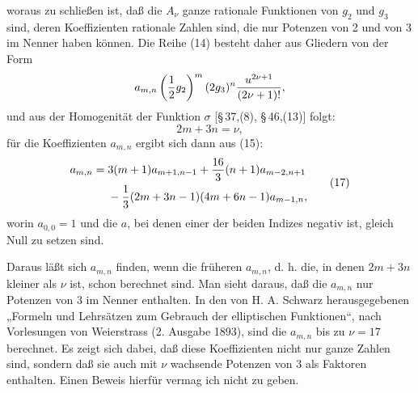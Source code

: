 \documentclass[11pt]{article}
\begin{document}
woraus zu schließen ist, daß die $A_\nu$ ganze rationale Funktionen von $g_2$ und $g_3$ sind, deren Koeffizienten rationale Zahlen sind, die nur Potenzen von 2 und von 3 im Nenner haben können. Die Reihe (14) besteht daher aus Gliedern von der Form
\[
a_{m,n}\left({1\over2}g_2\right)^m(2g_3)^n{u^{2\nu+1}\over(2\nu+1)!},
\]
und aus der Homogenität der Funktion $\sigma$ [\S\,37,(8), \S\,46,(13)] folgt:
\begin{equation}
2m+3n=\nu,
\tag{16}
\end{equation}
für die Koeffizienten $a_{m,n}$ ergibt sich dann aus (15):
\begin{equation}
\begin{aligned}
a_{m,n}={}&3(m+1)a_{m+1,n-1}+{16\over3}(n+1)a_{m-2,n+1}\\
&-{1\over3}(2m+3n-1)(4m+6n-1)a_{m-1,n},
\end{aligned}
\tag{17}
\end{equation}
worin $a_{0,0}=1$ und die $a$, bei denen einer der beiden Indizes negativ ist, gleich Null zu setzen sind.

Daraus läßt sich $a_{m,n}$ finden, wenn die früheren $a_{m,n}$, d. h. die, in denen $2m+3n$ kleiner als $\nu$ ist, schon berechnet sind. Man sieht daraus, daß die $a_{m,n}$ nur Potenzen von 3 im Nenner enthalten. In den von H. A. Schwarz herausgegebenen „Formeln und Lehrsätzen zum Gebrauch der elliptischen Funktionen“, nach Vorlesungen von Weierstrass (2. Ausgabe 1893), sind die $a_{m,n}$ bis zu $\nu=17$ berechnet. Es zeigt sich dabei, daß diese Koeffizienten nicht nur ganze Zahlen sind, sondern daß sie auch mit $\nu$ wachsende Potenzen von 3 als Faktoren enthalten. Einen Beweis hierfür vermag ich nicht zu geben.
\end{document}

